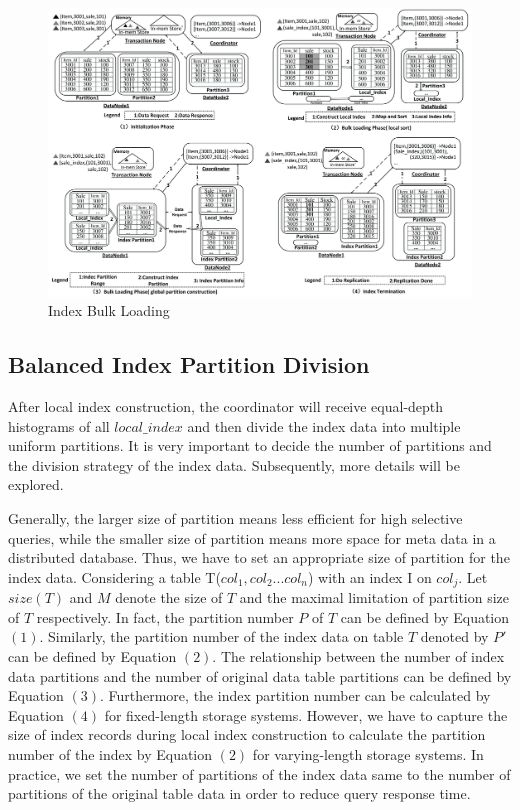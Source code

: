 \vspace{-0.6cm}
\begin{figure}
	\hspace*{-6mm}
	\includegraphics[width=13cm]{articlegraph/index_example.pdf}
	\caption{Index Bulk Loading}
\end{figure}
\vspace{-0.6cm}

\vspace{-0.2cm}
\subsection{Balanced Index Partition Division}
After local index construction, the coordinator will receive equal-depth histograms of all $local\_index$ and then divide the index data into multiple uniform partitions. It is very important to decide the number of partitions and the division strategy of the index data. Subsequently, more details will be explored.

Generally, the larger size of partition means less efficient for high selective queries, while the smaller size of partition means more space for meta data in a distributed database.
Thus, we have to set an appropriate size of partition for the index data.
Considering a table T($col_1,col_2...col_n$) with an index I on $col_j$.  Let $size(T)$ and  $M$  denote the size of $T$ and the maximal limitation of partition size of $T$ respectively. In fact, the partition number $P$ of $T$ can be defined by Equation $(1)$. Similarly, the partition number of the index data on table $T$ denoted by $P'$ can be defined by Equation $(2)$.  The relationship between the number of index data partitions and the number of original data table partitions can be defined by Equation $(3)$. Furthermore, the index partition number can be calculated by Equation $(4)$ for fixed-length storage systems. However, we have to capture the size of index records during local index construction to calculate the partition number of the index by Equation $(2)$ for varying-length storage systems. In practice, we set the number of partitions of the index data same to the number of partitions of the original table data in order to reduce query response time.


